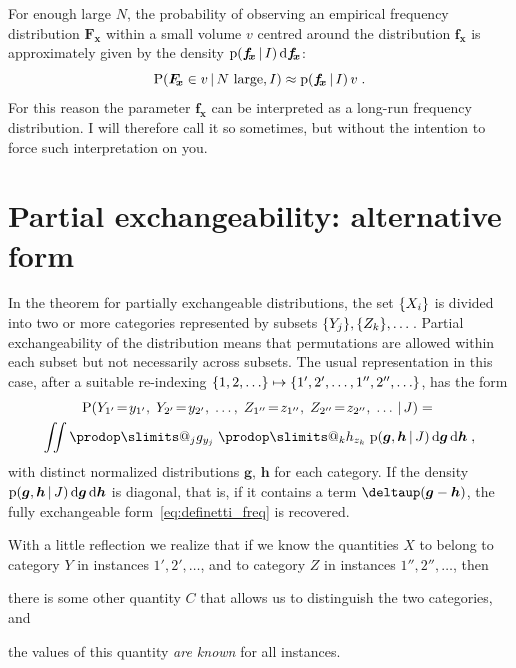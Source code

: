 \documentclass[\ifafour a4paper,12pt,\else a5paper,10pt,\fi%
onecolumn,oneside,article,%
british%
]{memoir}
\makeatletter
\theoremstyle{remark}
\theoremstyle{innote}
\def\prod{\DOTSI\prodop\slimits@}
\newcommand*{\delt}{\deltaup}%
\newcommand*{\di}{\mathrm{d}}%
\DeclarePairedDelimiter\set{\{}{\}}
\newcommand*{\pf}{\mathrm{p}}%
\newcommand*{\p}{\mathrm{P}}%
\renewcommand*{\|}[1][]{\nonscript\,#1\vert\nonscript\,\mathopen{}}
\renewcommand*{\=}{\TextOrMath\texteq\eq}
\newcommand*{\X}[1]{X_{#1}}
\newcommand*{\Y}[1]{Y_{#1}}
\newcommand*{\y}[1]{y_{#1}}
\newcommand*{\Z}[1]{Z_{#1}}
\newcommand*{\z}[1]{z_{#1}}
\newcommand*{\C}[1]{C_{#1}}
\newcommand*{\cc}[1]{c_{#1}}
\newcommand*{\vf}{v}
\newcommand*{\fx}{\bm{f_{\!x}}}
\newcommand*{\Fx}{\bm{F_{\!x}}}
\newcommand*{\bg}{\bm{g}}
\newcommand*{\bh}{\bm{h}}
\newcommand*{\zI}{J}
\makeatother
\begin{document}
For enough large $N$, the probability of observing an empirical frequency
distribution $\Fx$ within a small volume $\vf$ centred around the
distribution $\fx$ is approximately given by the density
$\pf(\fx \| I)\,\di\fx$:
\begin{equation}
  \label{eq:longrun_freq}
  \p( \Fx \in v \| \text{$N$ large}, I)
  \approx \pf(\fx \| I)\,v \;.
\end{equation}
For this reason the parameter $\fx$ can be interpreted as a long-run
frequency distribution. I will therefore call it so sometimes, but without
the intention to force such interpretation on you.


\section{Partial exchangeability: alternative form}
\label{sec:partial_exch}

In the theorem for partially exchangeable distributions, the set
$\set{\X{i}}$ is divided into two or more categories represented by subsets
$\set{\Y{j}}, \set{\Z{k}}, \dotsc$. Partial exchangeability of the
distribution means that permutations are allowed within each subset but not
necessarily across subsets. The usual representation in this case, after a
suitable re-indexing
$\set{1,2,\dotsc} \mapsto \set{1', 2', \dotsc, 1'', 2'', \dotsc}$, has the
form
\begin{multline}
  \label{eq:partialdefinetti}
  \p( \Y{1'}\=\y{1'},\; \Y{2'}\=\y{2'},\; \dotsc,\;
  \Z{1''}\=\z{1''},\; \Z{2''}\=\z{2''},\; \dotsc \| \zI) ={}\\
  \iint
  \prod_{j} g_{\y{j}}\;
  \prod_{k} h_{\z{k}}\;
  \pf(\bg,\bh \| \zI)\,\di\bg\,\di\bh \;,
\end{multline}
with distinct normalized distributions $\bg$, $\bh$ for each category. If
the density $\pf(\bg,\bh \| \zI)\,\di\bg\,\di\bh$ is diagonal, that is, if
it contains a term $\delt(\bg-\bh)$, the fully exchangeable
form~\eqref{eq:definetti_freq} is recovered.



With a little reflection we realize that if we know the quantities $X$ to
belong to category $Y$ in instances $1',2',\dotsc$, and to category $Z$ in
instances $1'',2'',\dotsc$, then
\begin{enumerate*}[label=(\alph*)]
\item there is some other quantity $C$ that allows us to distinguish the
  two categories, and \item the values %
  of this quantity \emph{are known} for all instances.
\end{enumerate*}
\end{document}
